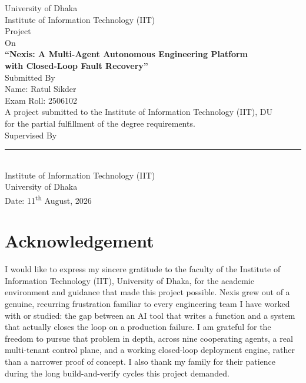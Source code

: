 \documentclass[12pt,oneside]{report}
\begin{document}
\begin{titlepage}
\begin{center}
\vspace*{0.3cm}
{\Large University of Dhaka}\\[4pt]
{\Large Institute of Information Technology (IIT)}\\[40pt]
{\large Project\\On}\\[10pt]
{\Large\bfseries ``Nexis: A Multi-Agent Autonomous Engineering Platform\\with Closed-Loop Fault Recovery''}\\[40pt]
{\large Submitted By}\\[10pt]
{\large Name: Ratul Sikder}\\
{\large Exam Roll: 2506102}\\[30pt]
{\normalsize A project submitted to the Institute of Information Technology (IIT), DU\\
for the partial fulfillment of the degree requirements.}\\[30pt]
{\large Supervised By}\\[10pt]
{\large \rule{6cm}{0.4pt}}\\[4pt]
{\normalsize Institute of Information Technology (IIT)}\\
{\normalsize University of Dhaka}\\[30pt]
{\normalsize Date: 11\textsuperscript{th} August, 2026}
\end{center}
\end{titlepage}

\chapter*{Acknowledgement}
I would like to express my sincere gratitude to the faculty of the Institute of
Information Technology (IIT), University of Dhaka, for the academic environment
and guidance that made this project possible. Nexis grew out of a genuine,
recurring frustration familiar to every engineering team I have worked with or
studied: the gap between an AI tool that writes a function and a system that
actually closes the loop on a production failure. I am grateful for the freedom
to pursue that problem in depth, across nine cooperating agents, a real
multi-tenant control plane, and a working closed-loop deployment engine, rather
than a narrower proof of concept. I also thank my family for their patience
during the long build-and-verify cycles this project demanded.
\end{document}
